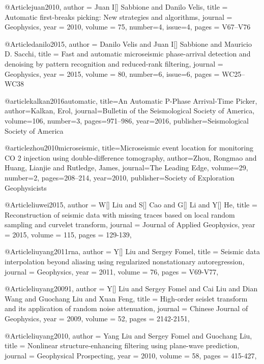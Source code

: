     @Article{juan2010,
  author = 	 {Juan I[] Sabbione and Danilo Velis},
  title = 	 {Automatic first-breaks picking: New strategies and algorithms},
  journal = 	 {Geophysics},
  year = 	 2010,
  volume = 	 75,
  number=4,
  issue=4,
  pages = 	 {V67–V76}} 
  
      @Article{danilo2015,
  author = 	 {Danilo Velis and Juan I[] Sabbione and Mauricio D. Sacchi},
  title = 	 {Fast and automatic microseismic phase-arrival detection and denoising by pattern recognition and reduced-rank filtering},
  journal = 	 {Geophysics},
  year = 	 2015,
  volume = 	 80,
  number=6,
  issue=6,
  pages = 	 {WC25–WC38}} 
  
@article{kalkan2016automatic,
  title={An Automatic P-Phase Arrival-Time Picker},
  author={Kalkan, Erol},
  journal={Bulletin of the Seismological Society of America},
  volume={106},
  number={3},
  pages={971--986},
  year={2016},
  publisher={Seismological Society of America}
}

@article{zhou2010microseismic,
  title={Microseismic event location for monitoring CO 2 injection using double-difference tomography},
  author={Zhou, Rongmao and Huang, Lianjie and Rutledge, James},
  journal={The Leading Edge},
  volume={29},
  number={2},
  pages={208--214},
  year={2010},
  publisher={Society of Exploration Geophysicists}
}
  
@Article{liuwei2015,
  author = 	 {W[] Liu and S[] Cao and G[] Li and Y[] He},
  title = 	 {Reconstruction of seismic data with missing traces based on local random sampling and curvelet transform},
  journal = 	 {Journal of Applied Geophysics},
  year = 	 2015,
  volume = 115,
  pages =	 {129-139},
}

@Article{liuyang2011rna,
  author = 	 {Y[] Liu and Sergey Fomel},
  title = 	 {Seismic data interpolation beyond aliasing using regularized nonstationary autoregression},
  journal = 	 {Geophysics},
  year = 	 2011,
  volume =	 76,
  pages =	 {V69-V77},
}

@Article{liuyang20091,
  author = 	 {Y[] Liu and Sergey Fomel and Cai Liu and Dian Wang and Guochang Liu and Xuan Feng},
  title = 	 {High-order seislet transform and its application of random noise attenuation},
  journal = 	 {Chinese Journal of Geophysics},
  year = 	 2009,
  volume =	 52,
  pages =	 {2142-2151},
}

@Article{liuyang2010,
  author = 	 {Yang Liu and Sergey Fomel and Guochang Liu},
  title = 	 {Nonlinear structure-enhancing filtering using plane-wave prediction},
  journal = 	 {Geophysical Prospecting},
  year = 	 2010,
  volume =	 58,
  pages =	 {415-427},
}

